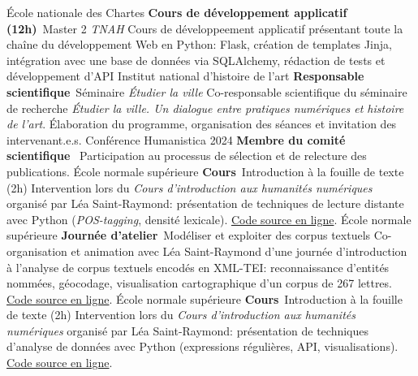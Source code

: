{%
	École nationale des Chartes}
{%
	\textbf{Cours de développement applicatif (12h)}~Master 2 \textit{TNAH}}
{%
	Cours de développeement applicatif présentant toute la chaîne du développement Web en Python: Flask, création de templates Jinja, intégration avec une base de données via SQLAlchemy, rédaction de tests et développement d'API}
	{%
		Institut national d'histoire de l'art}
	{%
		\textbf{Responsable scientifique}~Séminaire \textit{Étudier la ville}}
	{%
		Co-responsable scientifique du séminaire de recherche \textit{Étudier la ville. Un dialogue entre pratiques numériques et histoire de l'art}. Élaboration du programme, organisation des séances et invitation des intervenant.e.s.}
	{%
		Conférence Humanistica 2024}
	{%
		\textbf{Membre du comité scientifique}~}
	{%
		Participation au processus de sélection et de relecture des publications.}
	{%
		École normale supérieure}
	{%
		\textbf{Cours}~Introduction à la fouille de texte (2h)}
	{%
		Intervention lors du \textit{Cours d'introduction aux humanités numériques} organisé par Léa Saint-Raymond: présentation de techniques de lecture distante avec Python (\textit{POS-tagging}, densité lexicale). \href{https://github.com/paulhectork/cours_ens2024_fouille_de_texte.git}{Code source en ligne}.}
	{%
		École normale supérieure}
	{%
		\textbf{Journée d'atelier}~Modéliser et exploiter des corpus textuels}
	{%
		Co-organisation et animation avec Léa Saint-Raymond d'une journée d'introduction à l'analyse de corpus textuels encodés en XML-TEI: reconnaissance d'entités nommées, géocodage, visualisation cartographique d'un corpus de 267 lettres. \href{https://github.com/paulhectork/cours_ens2023_xmltei}{Code source en ligne}.}
	{%
		École normale supérieure}
	{%
		\textbf{Cours}~Introduction à la fouille de texte (2h)}
	{%
		Intervention lors du \textit{Cours d'introduction aux humanités numériques} organisé par Léa Saint-Raymond: présentation de techniques d'analyse de données avec Python (expressions régulières, API, visualisations). \href{https://github.com/paulhectork/cours_ens2024_fouille_de_texte.git}{Code source en ligne}.}

